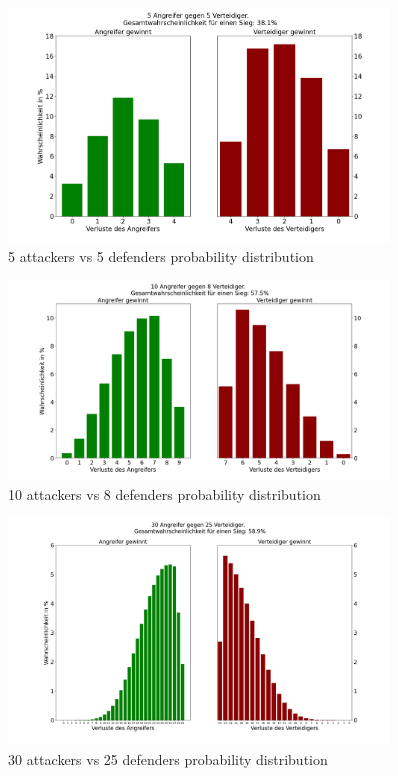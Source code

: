 \documentclass[11pt,a4paper]{article}
\begin{document}
    \begin{figure}[H]
        \centering
        \includegraphics[width=0.9\textwidth]{../images/Risk5v5.png}
        \caption{5 attackers vs 5 defenders probability distribution}
    \end{figure}

    \begin{figure}[H]
        \centering
        \includegraphics[width=0.9\textwidth]{../images/Risk10v8.png}
        \caption{10 attackers vs 8 defenders probability distribution}
    \end{figure}

    \begin{figure}[H]
        \centering
        \includegraphics[width=0.9\textwidth]{../images/Risk30v25.png}
        \caption{30 attackers vs 25 defenders probability distribution}
    \end{figure}
\end{document}
